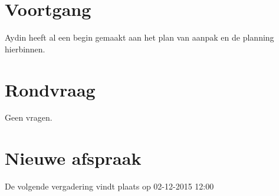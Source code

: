 \documentclass[dutch]{hu}
\begin{document}
\section{Voortgang}
Aydin heeft al een begin gemaakt aan het plan van aanpak en de planning hierbinnen.

\section{Rondvraag}
Geen vragen.

\section{Nieuwe afspraak}
De volgende vergadering vindt plaats op 02-12-2015 12:00
\end{document}
